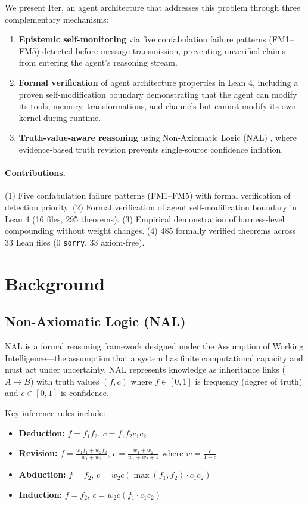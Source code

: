 \documentclass{article}
\begin{document}
We present Iter, an agent architecture that addresses this problem through three complementary mechanisms:

\begin{enumerate}
    \item \textbf{Epistemic self-monitoring} via five confabulation failure patterns (FM1--FM5) detected before message transmission, preventing unverified claims from entering the agent's reasoning stream.
    \item \textbf{Formal verification} of agent architecture properties in Lean 4, including a proven self-modification boundary demonstrating that the agent can modify its tools, memory, transformations, and channels but cannot modify its own kernel during runtime.
    \item \textbf{Truth-value-aware reasoning} using Non-Axiomatic Logic (NAL) \citep{wang1995}, where evidence-based truth revision prevents single-source confidence inflation.
\end{enumerate}

\paragraph{Contributions.}
(1) Five confabulation failure patterns (FM1--FM5) with formal verification of detection priority.
(2) Formal verification of agent self-modification boundary in Lean 4 (16 files, 295 theorems).
(3) Empirical demonstration of harness-level compounding without weight changes.
(4) 485 formally verified theorems across 33 Lean files (0 \texttt{sorry}, 33 axiom-free).

\section{Background}
\label{sec:background}

\subsection{Non-Axiomatic Logic (NAL)}

NAL \citep{wang1995} is a formal reasoning framework designed under the Assumption of Working Intelligence—the assumption that a system has finite computational capacity and must act under uncertainty. NAL represents knowledge as inheritance links ($A \to B$) with truth values $(f, c)$ where $f \in [0,1]$ is frequency (degree of truth) and $c \in [0,1]$ is confidence.

Key inference rules include:
\begin{itemize}
    \item \textbf{Deduction:} $f = f_1 f_2$, $c = f_1 f_2 c_1 c_2$
    \item \textbf{Revision:} $f = \frac{w_1 f_1 + w_2 f_2}{w_1 + w_2}$, $c = \frac{w_1 + w_2}{w_1 + w_2 + 1}$ where $w = \frac{c}{1-c}$
    \item \textbf{Abduction:} $f = f_2$, $c = w_2c(\max(f_1, f_2) \cdot c_1 c_2)$
    \item \textbf{Induction:} $f = f_2$, $c = w_2c(f_1 \cdot c_1 c_2)$
\end{itemize}
\end{document}
